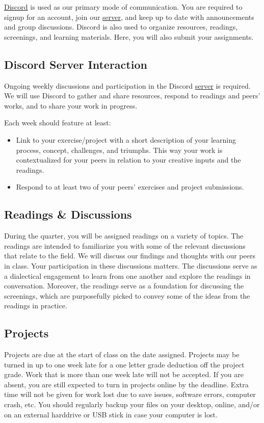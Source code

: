 \href{http://discordapp.com/}{Discord} is used as our primary mode of communication. You are required to signup for an account, join our \href{\discordURL}{server}, and keep up to date with announcements and group discussions. Discord is also used to organize resources, readings, screenings, and learning materials. Here, you will also submit your assignments.

\subsection{Discord Server Interaction}
Ongoing weekly discussions and participation in the Discord \href{\discordURL}{server} is required. We will use Discord to gather and share resources, respond to readings and peers' works, and to share your work in progress.

Each week should feature at least:
\begin{itemize}
      \tightlist
      \item Link to your exercise/project with a short description of your learning process, concept, challenges, and triumphs. This way your work is contextualized for your peers in relation to your creative inputs and the readings.
      \item Respond to at least two of your peers' exercises and project submissions.
\end{itemize}

\subsection{Readings \& Discussions}

During the quarter, you will be assigned readings on a variety of topics. The readings are intended to familiarize you with some of the relevant discussions that relate to the field. We will discuss our findings and thoughts with our peers in class. Your participation in these discussions matters. The discussions serve as a dialectical engagement to learn from one another and explore the readings in conversation. Moreover, the readings serve as a foundation for discussing the screenings, which are purposefully picked to convey some of the ideas from the readings in practice.

\subsection{Projects}

Projects are due at the start of class on the date assigned. Projects may be turned in up to one week late for a one letter grade deduction off the project grade. Work that is more than one week late will not be accepted. If you are absent, you are still expected to turn in projects online by the deadline. Extra time will not be given for work lost due to save issues, software errors, computer crash, etc. You should regularly backup your files on your desktop, online, and/or on an external harddrive or USB stick in case your computer is lost.

